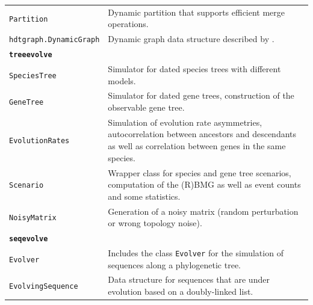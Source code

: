 \documentclass[hidelinks,11pt]{article}
\begin{document}
{\begin{longtable}{| p{4.0cm} | p{10cm} |}
  \texttt{Partition} &
  Dynamic partition that supports efficient merge operations. \\
  \texttt{hdtgraph.DynamicGraph} &
  Dynamic graph data structure described by \citet{holm2001}. \\
	\hline
	\multicolumn{2}{|l|}{\textbf{\texttt{treeevolve}}}\\
	\hline
	\texttt{SpeciesTree} &
	Simulator for dated species trees with different models. \\
	\texttt{GeneTree} &
	Simulator for dated gene trees, construction of the observable gene tree. \\
	\texttt{EvolutionRates} &
	Simulation of evolution rate asymmetries, autocorrelation between ancestors and descendants as well as correlation between genes in the same species. \\
	\texttt{Scenario} &
	Wrapper class for species and gene tree scenarios, computation of the (R)BMG as well as event counts and some statistics. \\
	\texttt{NoisyMatrix} &
	Generation of a noisy matrix (random perturbation or wrong topology noise). \\
	\hline
	\multicolumn{2}{|l|}{\textbf{\texttt{seqevolve}}}\\
	\hline
	\texttt{Evolver} &
	Includes the class \texttt{Evolver} for the simulation of sequences along a phylogenetic tree. \\
	\texttt{EvolvingSequence} &
	Data structure for sequences that are under evolution based on a doubly-linked list. \\

\end{longtable}}
\end{document}
